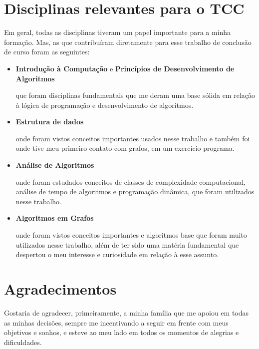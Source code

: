 \documentclass[a4paper,12pt]{article}
\begin{document}
\section{Disciplinas relevantes para o TCC}
Em geral, todas as disciplinas tiveram um papel importante
para a minha formação. Mas, as que contribuíram
diretamente para esse trabalho de conclusão de curso
 foram as seguintes:

\begin{itemize}
	\item \textbf{Introdução à Computação} e 
	\textbf{Princípios de Desenvolvimento de Algoritmos}


		que foram disciplinas fundamentais que me deram  
		 uma base sólida em relação
		à lógica de programação e desenvolvimento de algoritmos.

	\item \textbf{Estrutura de dados}

		onde foram vistos conceitos importantes usados 
		nesse trabalho e também foi
		onde tive meu primeiro contato com grafos,
		em um exercício programa.
		
	\item \textbf{Análise de Algoritmos}

		onde foram estudados conceitos de classes de complexidade computacional,
		análise de tempo de algoritmos e programação dinâmica, que foram
		utilizados nesse trabalho.

	\item \textbf{Algoritmos em Grafos}
	
		onde foram vistos conceitos importantes e algoritmos 
		base que foram muito utilizados nesse trabalho, 
		além de ter sido uma matéria fundamental que despertou o meu interesse 
		e curiosidade em relação à esse assunto.
\end{itemize}

\newpage

\section{Agradecimentos}
Gostaria de agradecer, primeiramente, a minha família
que me apoiou em todas as minhas decisões, sempre
me incentivando a seguir em frente com meus objetivos e sonhos,
e esteve ao meu lado em todos os momentos de alegrias e dificuldades.
\end{document}
